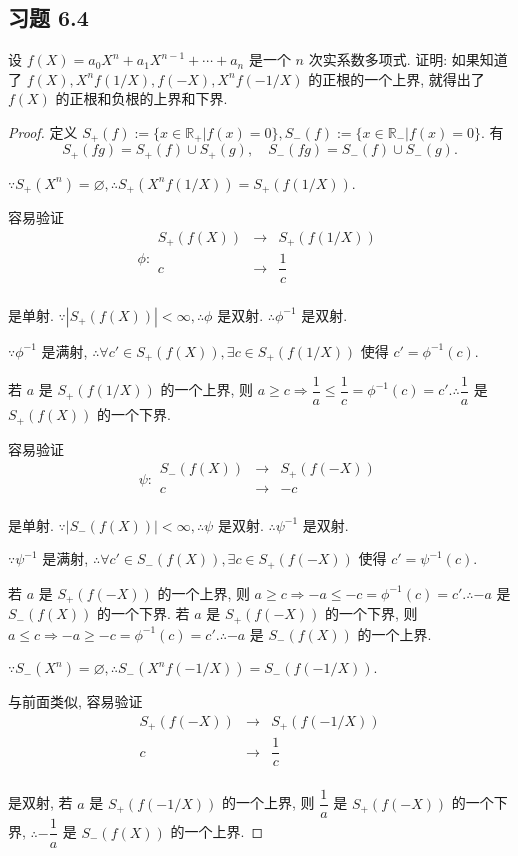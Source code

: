 \documentclass[UTF8]{ctexart}
\begin{document}
\subsection{习题 6.4}
\addtocounter{exsection}{1}
\begin{exercise}\label{ex4.1}
    设 $f(X)=a_0X^n+a_1X^{n-1}+\cdots+a_n$ 是一个 $n$ 次实系数多项式. 证明: 如果知道了 $f(X),X^nf(1/X),f(-X),X^nf(-1/X)$ 的正根的一个上界, 就得出了 $f(X)$ 的正根和负根的上界和下界.
\end{exercise}
\begin{proof}
    定义 $S_+(f):=\{x\in\mathbb{R}_+|f(x)=0\},S_-(f):=\{x\in\mathbb{R}_-|f(x)=0\}$. 有
    \[S_+(fg)=S_+(f)\cup S_+(g),\quad S_-(fg)=S_-(f)\cup S_-(g).\]

    $\because S_+(X^n)=\varnothing,\therefore S_+(X^nf(1/X))=S_+(f(1/X))$.

    容易验证
    \[\phi:\begin{array}{rcl}
        S_+(f(X)) & \to & S_+(f(1/X)) \\
        c & \to & \dfrac{1}{c} \\
    \end{array}\]
    
    是单射. $\because|S_+(f(X))|<\infty,\therefore\phi$ 是双射. $\therefore\phi^{-1}$ 是双射.

    $\because\phi^{-1}$ 是满射, $\therefore\forall c'\in S_+(f(X)),\exists c\in S_+(f(1/X))$ 使得 $c'=\phi^{-1}(c)$.

    若 $a$ 是 $S_+(f(1/X))$ 的一个上界, 则 $a\geq c\Rightarrow\dfrac{1}{a}\leq\dfrac{1}{c}=\phi^{-1}(c)=c'.\therefore\dfrac{1}{a}$ 是 $S_+(f(X))$ 的一个下界.

    容易验证
    \[\psi:\begin{array}{rcl}
        S_-(f(X)) & \to & S_+(f(-X)) \\
        c & \to & -c \\
    \end{array}\]
    
    是单射. $\because|S_-(f(X))|<\infty,\therefore\psi$ 是双射. $\therefore\psi^{-1}$ 是双射.

    $\because\psi^{-1}$ 是满射, $\therefore\forall c'\in S_-(f(X)),\exists c\in S_+(f(-X))$ 使得 $c'=\psi^{-1}(c)$.

    若 $a$ 是 $S_+(f(-X))$ 的一个上界, 则 $a\geq c\Rightarrow-a\leq-c=\phi^{-1}(c)=c'.\therefore-a$ 是 $S_-(f(X))$ 的一个下界. 若 $a$ 是 $S_+(f(-X))$ 的一个下界, 则 $a\leq c\Rightarrow-a\geq-c=\phi^{-1}(c)=c'.\therefore-a$ 是 $S_-(f(X))$ 的一个上界.

    $\because S_-(X^n)=\varnothing,\therefore S_-(X^nf(-1/X))=S_-(f(-1/X))$.

    与前面类似, 容易验证
    \[\begin{array}{rcl}
        S_+(f(-X)) & \to & S_+(f(-1/X)) \\
        c & \to & \dfrac{1}{c} \\
    \end{array}\]

    是双射, 若 $a$ 是 $S_+(f(-1/X))$ 的一个上界, 则 $\dfrac{1}{a}$ 是 $S_+(f(-X))$ 的一个下界, $\therefore-\dfrac{1}{a}$ 是 $S_-(f(X))$ 的一个上界.
\end{proof}
\end{document}
